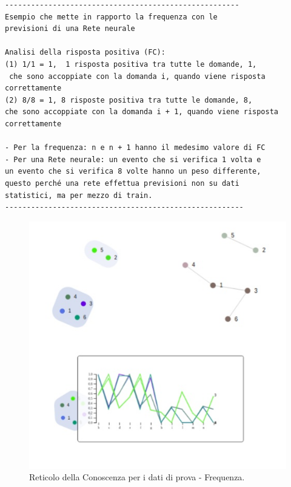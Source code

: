 \begin{verbatim}
------------------------------------------------------
Esempio che mette in rapporto la frequenza con le 
previsioni di una Rete neurale

Analisi della risposta positiva (FC):
(1) 1/1 = 1,  1 risposta positiva tra tutte le domande, 1,
 che sono accoppiate con la domanda i, quando viene risposta
correttamente	
(2) 8/8 = 1, 8 risposte positiva tra tutte le domande, 8,
che sono accoppiate con la domanda i + 1, quando viene risposta
correttamente

- Per la frequenza: n e n + 1 hanno il medesimo valore di FC
- Per una Rete neurale: un evento che si verifica 1 volta e
un evento che si verifica 8 volte hanno un peso differente,
questo perché una rete effettua previsioni non su dati
statistici, ma per mezzo di train.
-------------------------------------------------------
\end{verbatim}


\begin{figure}[H]
\centering
	\includegraphics[width=0.50\linewidth]{./image/collage_reticolo-general-FREQ.png}
	\caption{Reticolo della Conoscenza per i dati di prova - Frequenza.}
	\label{Reticolo della Conoscenza per i dati di prova - Frequenza.}
\end{figure}
\noindent


